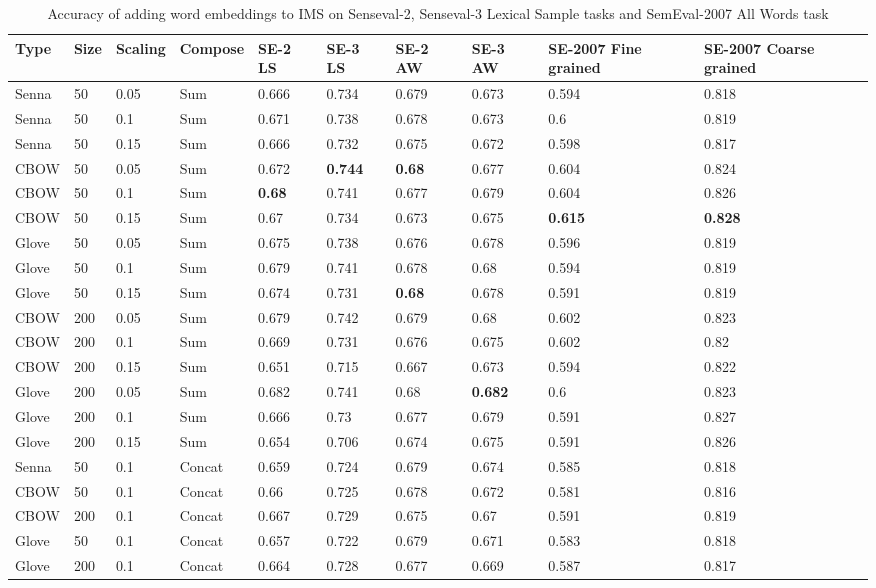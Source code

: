 \begin{table}[th]
	\caption{Accuracy of adding word embeddings to IMS on Senseval-2, Senseval-3 Lexical Sample tasks and SemEval-2007 All Words task}
	\label{table:full}
	\begin{center}
\begin{tabular}{|p{1cm}|p{0.5cm}|p{1cm}|p{1.5cm}|p{1.5cm}|p{1.5cm}|p{1.5cm}|p{1.5cm}|p{1.5cm}|p{1.5cm}|}
Type & Size & Scaling & Compose & SE-2 LS & SE-3 LS & SE-2 AW & SE-3 AW & SE-2007 Fine grained & SE-2007 Coarse grained \\
\hline
Senna&50&0.05&Sum&0.666&0.734&0.679&0.673&0.594&0.818 \\
\hline
Senna&50&0.1&Sum&0.671&0.738&0.678&0.673&0.6&0.819 \\
\hline
Senna&50&0.15&Sum&0.666&0.732&0.675&0.672&0.598&0.817 \\
\hline
CBOW&50&0.05&Sum&0.672&{\bf 0.744}&{\bf 0.68}&0.677&0.604&0.824\\
\hline
CBOW&50&0.1&Sum&{\bf 0.68}&0.741&0.677&0.679 &0.604 & 0.826\\
\hline
CBOW&50&0.15&Sum&0.67&0.734&0.673&0.675&{\bf 0.615}&{\bf 0.828}\\
\hline
Glove&50&0.05&Sum&0.675&0.738&0.676&0.678&0.596&0.819 \\
\hline
Glove&50&0.1&Sum&0.679&0.741&0.678&0.68&0.594&0.819 \\
\hline
Glove&50&0.15&Sum&0.674&0.731&{\bf 0.68}&0.678&0.591&0.819 \\
\hline
CBOW&200&0.05&Sum&0.679&0.742&0.679&0.68&0.602&0.823 \\
\hline
CBOW&200&0.1&Sum&0.669&0.731&0.676&0.675&0.602&0.82 \\
\hline
CBOW&200&0.15&Sum&0.651&0.715&0.667&0.673&0.594&0.822 \\
\hline
Glove&200&0.05&Sum&0.682&0.741&0.68&{\bf0.682}&0.6&0.823 \\
\hline
Glove&200&0.1&Sum&0.666&0.73&0.677&0.679&0.591&0.827 \\
\hline
Glove&200&0.15&Sum&0.654&0.706&0.674&0.675&0.591&0.826 \\
\hline
Senna&50&0.1&Concat&0.659&0.724&0.679&0.674&0.585&0.818 \\
\hline
CBOW&50&0.1&Concat&0.66&0.725&0.678&0.672&0.581&0.816\\
\hline
CBOW&200&0.1&Concat&0.667&0.729&0.675&0.67&0.591&0.819\\
\hline
Glove&50&0.1&Concat&0.657&0.722&0.679&0.671&0.583&0.818\\
\hline
Glove&200&0.1&Concat&0.664&0.728&0.677&0.669&0.587&0.817\\
\hline
\end{tabular}
	\end{center}
\end{table}

